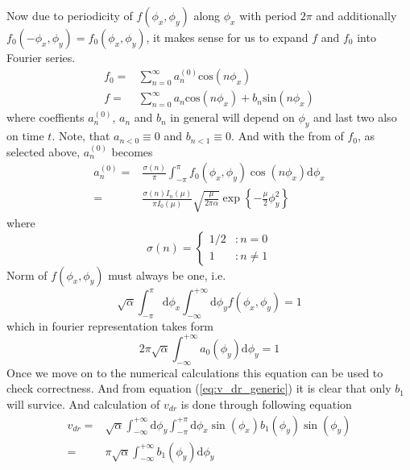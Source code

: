 \documentclass[40pt,letterpaper,physrev]{article}
\begin{document}
	Now due to periodicity of $f(\phi_x,\phi_y)$ along $\phi_x$ with 
	period $2\pi$ and additionally 
	$f_0(-\phi_x, \phi_y)=f_0(\phi_x, \phi_y)$, it makes sense 
	for us to expand $f$ and $f_0$ into Fourier series.
	\begin{align}
		f_0=&\sum^\infty_{n=0}a^{(0)}_{n}\text{cos}(n\phi_x)\label{eq:f0_fourier_representation} \\
		f=&\sum^\infty_{n=0}a_{n}\text{cos}(n\phi_x)+
		b_{n}\text{sin}(n\phi_x)\label{eq:f_fourier_representation}
	\end{align}
	where coeffients $a^{(0)}_n$, $a_n$ and $b_n$ in general will depend on $\phi_y$ and last two also on time $t$. Note, that $a_{n<0}\equiv 0$ and $b_{n<1}\equiv 0$. And with the from of $f_0$, as selected above, $a^{(0)}_n$ becomes
	\begin{align}
		a^{(0)}_n=&\frac{\sigma(n)}{\pi}\int^{\pi}_{-\pi}f_0(\phi_x,\phi_y)\cos(n\phi_x)\text{d}\phi_x \\
		=&\frac{\sigma(n)I_n(\mu)}{\pi I_0(\mu)}\sqrt{\frac{\mu}{2\pi\alpha}}\exp{\left \{ -\frac{\mu}{2}\phi^2_y\right \} }
	\end{align}
	where 
	\begin{equation}
		\sigma(n)=
		\begin{cases}
   		1/2 & : n=0 \\
   		1 & : n\ne 1
  		\end{cases}
	\end{equation}
	Norm of $f(\phi_x,\phi_y)$ must always be one, i.e.
	\begin{equation}
		\sqrt{\alpha}\int^{\pi}_{-\pi}\text{d}\phi_x
			\int^{+\infty}_{-\infty}\text{d}\phi_y f(\phi_x,\phi_y)=1
	\end{equation}
	which in fourier representation takes form
	\begin{equation}
	\boxed{
		2\pi\sqrt{\alpha}\int^{+\infty}_{-\infty}a_0(\phi_y)\text{d}
		\phi_y=1}
	\end{equation}
	Once we move on to the numerical calculations this equation can be used to check correctness. And from equation (\ref{eq:v_dr_generic}) it is clear that only $b_1$ will survice. And calculation of $v_{dr}$ is done through following 
	equation
	\begin{align}
		v_{dr}=&\sqrt{\alpha}\int^{+\infty}_{-\infty}\text{d}\phi_{y}\int^{+\pi}_{-\pi}\text{d}\phi_x\sin(\phi_x)b_1(\phi_y)\sin(\phi_y)\\
		=&\pi\sqrt{\alpha}\int^{+\infty}_{-\infty}b_1(\phi_y)\text{d}\phi_y
	\end{align}
\end{document}
